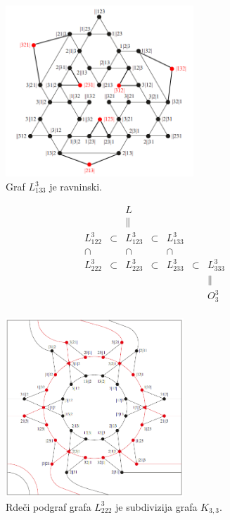 \documentclass[dvipsnames]{beamer}
\begin{document}
\begin{frame}
    \begin{figure}[h]
        \includegraphics[width=200pt]{../img/graph-L^3_133.png}
        \caption{Graf $L^3_{133}$ je ravninski.}
        \label{fig:L^3_133}
    \end{figure}
\end{frame}

\begin{frame}
    \begin{equation*}
        \begin{matrix}
            & & L & & & & \\
            & & \parallel & & & & \\
            L_{122}^3 & \subset & L_{123}^3 & \subset & L_{133}^3 & & \\
            \cap & & \cap & & \cap & & \\
            L_{222}^3 & \subset & L_{223}^3 & \subset & L_{233}^3 & \subset & L_{333}^3 \\
            & & & & & & \parallel \\
            & & & & & & O^3_3 \\
        \end{matrix}
    \end{equation*}
\end{frame}

\begin{frame}
    \begin{figure}[h]
        \includegraphics[width=190pt]{../img/tolgraph-O^3_222-subdivision.png}
        \caption{Rdeči podgraf grafa $L_{222}^3$ je subdivizija grafa $K_{3,3}$.}
    \end{figure}
\end{frame}
\end{document}

